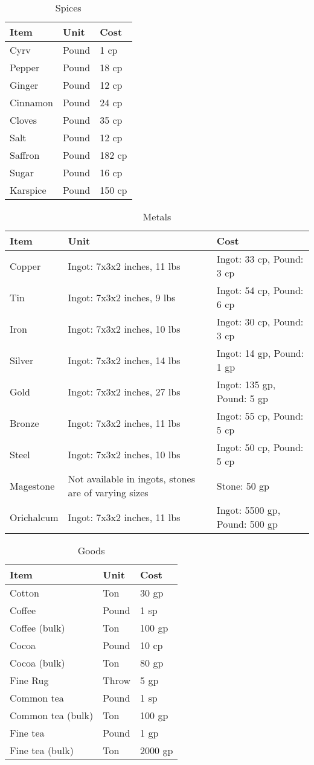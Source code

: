 \documentclass[oneside,11pt,english]{book}
\begin{document}
\begin{table}[hb]
	\centering
	\caption{Spices}
	\label{tab:Spices}
	\begin{tabu} spread 0pt {*{3}{X[-1]}}
		Item &Unit &Cost\\\toprule
Cyrv &Pound &1 cp\\
Pepper &Pound &18 cp\\
Ginger &Pound &12 cp\\
Cinnamon &Pound &24 cp\\
Cloves &Pound &35 cp\\
Salt &Pound &12 cp\\
Saffron &Pound &182 cp\\
Sugar &Pound &16 cp\\
Karspice &Pound &150 cp\\
	\end{tabu}
\end{table}

\begin{table}[hb]
	\centering
	\caption{Metals}
	\label{tab:Metals}
	\begin{tabu} spread 0pt {*{3}{X[-1]}}
		Item &Unit &Cost\\\toprule
Copper &Ingot: 7x3x2 inches, 11 lbs &Ingot: 33 cp, Pound: 3 cp\\
Tin &Ingot: 7x3x2 inches, 9 lbs &Ingot: 54 cp, Pound: 6 cp\\
Iron &Ingot: 7x3x2 inches, 10 lbs &Ingot: 30 cp, Pound: 3 cp\\
Silver &Ingot: 7x3x2 inches, 14 lbs &Ingot: 14 gp, Pound: 1 gp\\
Gold &Ingot: 7x3x2 inches, 27 lbs &Ingot: 135 gp, Pound: 5 gp\\
Bronze &Ingot: 7x3x2 inches, 11 lbs &Ingot: 55 cp, Pound: 5 cp\\
Steel &Ingot: 7x3x2 inches, 10 lbs &Ingot: 50 cp, Pound: 5 cp\\
Magestone &Not available in ingots, stones are of varying sizes &Stone: 50 gp\\
Orichalcum &Ingot: 7x3x2 inches, 11 lbs &Ingot: 5500 gp, Pound: 500 gp\\
	\end{tabu}
\end{table}


\begin{table}[hb]
	\centering
	\caption{Goods}
	\label{tab:Goods}
	\begin{tabu} spread 0pt {*{3}{X[-1]}}
		Item &Unit &Cost\\\toprule
Cotton &Ton &30 gp\\
Coffee &Pound &1 sp\\
Coffee (bulk) &Ton &100 gp\\
Cocoa &Pound &10 cp\\
Cocoa (bulk) &Ton &80 gp\\
Fine Rug &Throw &5 gp\\
Common tea &Pound &1 sp\\
Common tea (bulk) &Ton &100 gp\\
Fine tea &Pound &1 gp\\
Fine tea (bulk) &Ton &2000 gp\\
	\end{tabu}
\end{table}
\clearpage
\end{document}
